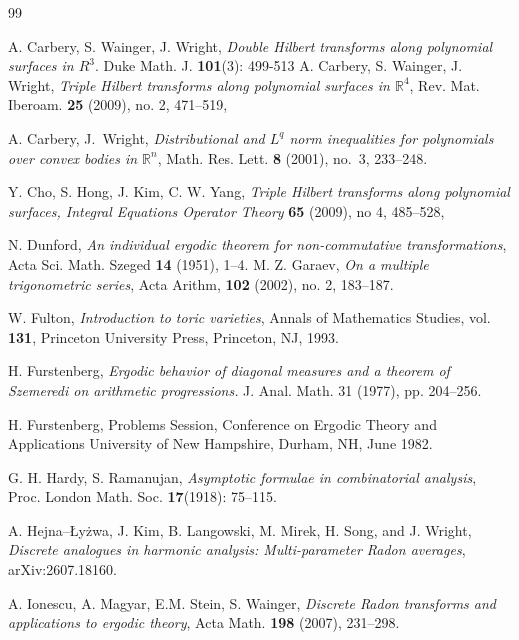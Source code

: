 \documentclass[11 pt,letterpaper]{amsart}
\theoremstyle{plain}
\theoremstyle{definition}
\theoremstyle{remark} \theoremstyle{exam} \theoremstyle{ob}
\numberwithin{equation}{section}
\begin{document}
\begin{thebibliography}{99}
 

 

 A. Carbery, S. Wainger, J. Wright, \emph{Double Hilbert transforms
	along polynomial surfaces in $R^{3}$}.  Duke Math. J. \textbf{101}(3): 499-513
A. Carbery, S. Wainger,  J. Wright, \emph{Triple Hilbert transforms along polynomial
surfaces in $\mathbb{R}^4$}, Rev. Mat. Iberoam.  \textbf{25} (2009), no. 2, 471--519,  

 A. Carbery, J.~Wright,
\emph{Distributional and $L^q$ norm inequalities for polynomials over convex bodies in $\mathbb{R}^n$},
Math. Res. Lett. \textbf{8} (2001), no.~3, 233--248.



 

 Y. Cho, S. Hong, J. Kim, C. W. Yang,  \emph{Triple Hilbert transforms
along polynomial surfaces, Integral Equations Operator Theory} \textbf{65} (2009), no 4, 485--528,

N. Dunford, \emph{An individual ergodic theorem for non-commutative transformations},  Acta Sci. Math. Szeged \textbf{14 } (1951),  1--4.
  M. Z. Garaev, \emph{On a multiple trigonometric series},  Acta Arithm, \textbf{102} (2002), no. 2, 183–187.



 


 W. Fulton,  \emph{Introduction to toric varieties}, Annals of Mathematics Studies, vol. \textbf{131},
Princeton University Press, Princeton, NJ, 1993.  



 H. Furstenberg, \emph{Ergodic behavior of diagonal measures and a theorem of Szemeredi on arithmetic progressions.} J. Anal. Math. 31 (1977), pp. 204–256.

 H. Furstenberg, Problems Session, Conference on Ergodic Theory and Applications University of New Hampshire, Durham, NH, June 1982.

 G. H. Hardy, S. Ramanujan, \emph{Asymptotic formulae in combinatorial analysis}, Proc. London Math. Soc. \textbf{17}(1918):  75--115.

A. Hejna--Łyżwa, J. Kim, B. Langowski, M. Mirek, H. Song, and J. Wright,
\emph{Discrete analogues in harmonic analysis: Multi-parameter Radon averages},
	arXiv:2607.18160.

 

 A. Ionescu, A. Magyar, E.M. Stein, S. Wainger, \emph{Discrete Radon transforms and applications to ergodic
theory},    Acta Math. \textbf{198} (2007), 231--298.


\end{thebibliography}
\end{document}
